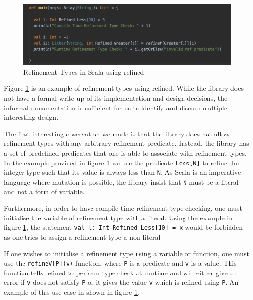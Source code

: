 \documentclass[a4paper,12pt]{report}
\begin{document}
\begin{figure}[H]
  \begin{center}
    \includegraphics[scale=0.7]{assets/refined_scala.PNG}
  \end{center}
  \caption{Refinement Types in Scala using refined}
  \label{code:refined-scala}
\end{figure}

Figure \ref{code:refined-scala} is an example of refinement types using  
refined. While the library does not have a formal write up of its 
implementation and design decisions, the informal documentation is sufficient 
for us to identify and discuss multiple interesting design. 

\par
The first interesting observation we made is that the library does not allow 
refinement types with any arbitrary refinement predicate. Instead,  
the library has a set of predefined predicates that one is able to associate 
with refinement types. In the example provided in figure \ref{code:refined-scala} 
we use the predicate \verb|Less[N]| to refine the integer type such that its value 
is always less than \verb|N|. As Scala is an imperative language where mutation 
is possible, the library insist that \verb|N| must be a 
literal and not a form of variable.

\par
Furthermore, in order to have compile time refinement type checking, one must 
initialise the variable of refinement type with a literal. Using the example 
in figure \ref{code:refined-scala}, the statement 
\verb|val l: Int Refined Less[10] = x| would be forbidden as one tries to assign a 
refinement type a non-literal. 

\par
If one wishes to initialise a refinement type using a variable or function, one 
must use the \verb|refineV[P](v)| function, where \verb|P| is a predicate and 
\verb|v| is a value. This function tells refined to perform type check 
at runtime and will either give an error if \verb|v| does not 
satisfy \verb|P| or it gives the value \verb|v| which is refined using \verb|P|. 
An example of this use case in shown in figure \ref{code:refined-scala}.
\end{document}

